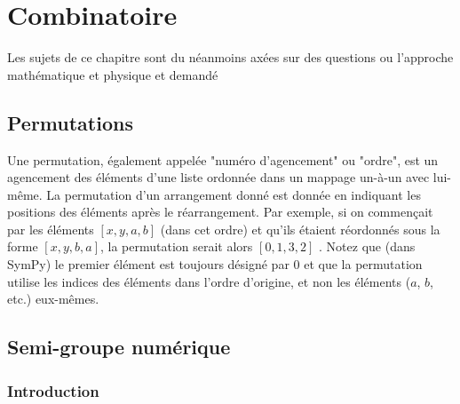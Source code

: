 \part{Combinatoire}

Les sujets de ce chapitre sont du néanmoins axées sur des questions ou l'approche mathématique et 
physique et demandé 

\chapter{Permutations}
Une permutation, également appelée "numéro d'agencement" ou "ordre", est un agencement des éléments d'une liste ordonnée dans un mappage un-à-un avec lui-même. La permutation d'un arrangement donné est donnée en indiquant les positions des éléments après le réarrangement. Par exemple, si on commençait par les éléments $\left[x, y, a, b\right]$ (dans cet ordre) et qu'ils étaient réordonnés sous la forme $\left[x, y, b, a\right]$, la permutation serait alors $\left[0, 1, 3, 2\right]$ . Notez que (dans SymPy) le premier élément est toujours désigné par $0$ et que la permutation utilise les indices des éléments dans l'ordre d'origine, et non les éléments ($a$, $b$, etc.) eux-mêmes.
\chapter{Semi-groupe numérique}
\section{Introduction}

